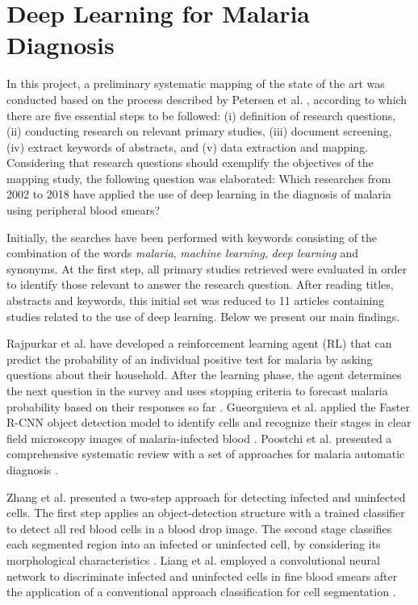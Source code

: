 \section{Deep Learning for Malaria Diagnosis}

In this project, a preliminary systematic mapping of the state of the art was conducted based on the process described by Petersen et al. \cite{Petersen2015}, according to which there are five essential steps to be followed: (i) definition of research questions, (ii) conducting research on relevant primary studies, (iii) document screening, (iv) extract keywords of abstracts, and (v) data extraction and mapping. Considering that research questions should exemplify the objectives of the mapping study, the following question was elaborated: Which researches from 2002 to 2018 have applied the use of deep learning in the diagnosis of malaria using peripheral blood smears?

Initially, the searches have been performed with keywords consisting of the combination of the words \textit{malaria}, \textit{machine learning}, \textit{deep learning} and synonyms. At the first step, all primary studies retrieved were evaluated in order to identify those relevant to answer the research question. After reading titles, abstracts and keywords, this initial set was reduced to 11 articles containing studies related to the use of deep learning. Below we present our main findings.

Rajpurkar et al. have developed a reinforcement learning agent (RL) that can predict the probability of an individual positive test for malaria by asking questions about their household. After the learning phase, the agent determines the next question in the survey and uses stopping criteria to forecast malaria probability based on their responses so far \cite{Rajpurkar2017}. Gueorguieva et al. applied the Faster R-CNN object detection model to identify cells and recognize their stages in clear field microscopy images of malaria-infected blood \cite{hung2017applying}. Poostchi et al. presented a comprehensive systematic review with a set of approaches for malaria automatic diagnosis \cite{Poostchi2018}.



Zhang et al. presented a two-step approach for detecting infected and uninfected cells. The first step applies an object-detection structure with a trained classifier to detect all red blood cells in a blood drop image. The second stage classifies each segmented region into an infected or uninfected cell, by considering its morphological characteristics \cite{Zhang2016}. Liang et al. employed a convolutional neural network to discriminate infected and uninfected cells in fine blood smears after the application of a conventional  approach classification for cell segmentation \cite{Liang2017}.

